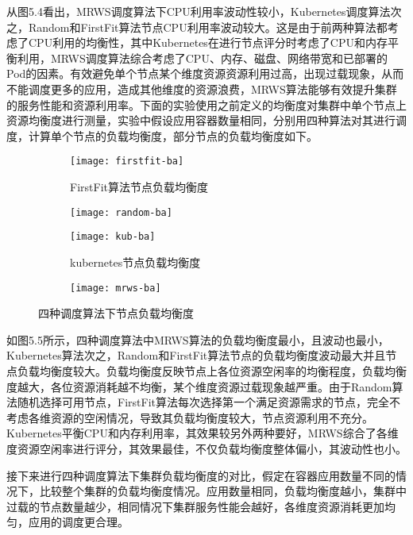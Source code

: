 从图5.4看出，MRWS调度算法下CPU利用率波动性较小，Kubernetes调度算法次之，Random和FirstFit算法节点CPU利用率波动较大。这是由于前两种算法都考虑了CPU利用的均衡性，其中Kubernetes在进行节点评分时考虑了CPU和内存平衡利用，MRWS调度算法综合考虑了CPU、内存、磁盘、网络带宽和已部署的Pod的因素。有效避免单个节点某个维度资源资源利用过高，出现过载现象，从而不能调度更多的应用，造成其他维度的资源浪费，MRWS算法能够有效提升集群的服务性能和资源利用率。下面的实验使用之前定义的均衡度对集群中单个节点上资源均衡度进行测量，实验中假设应用容器数量相同，分别用四种算法对其进行调度，计算单个节点的负载均衡度，部分节点的负载均衡度如下。

\begin{figure}[H]
	\centering%
	\begin{subfigure}{7cm}
		\texttt{[image: firstfit-ba]}
		\caption{FirstFit算法节点负载均衡度}
	\end{subfigure}%
	\hspace{0.5cm}%
	\begin{subfigure}{7cm}
		\texttt{[image: random-ba]}
	\end{subfigure}
	\begin{subfigure}{7cm}
		\texttt{[image: kub-ba]}
		\caption{kubernetes节点负载均衡度}
	\end{subfigure}%
	\hspace{0.5cm}%
	\begin{subfigure}{7cm}
		\texttt{[image: mrws-ba]}
	\end{subfigure}
	\caption{四种调度算法下节点负载均衡度}
	
\end{figure}

如图5.5所示，四种调度算法中MRWS算法的负载均衡度最小，且波动也最小，Kubernetes算法次之，Random和FirstFit算法节点的负载均衡度波动最大并且节点负载均衡度较大。负载均衡度反映节点上各位资源空闲率的均衡程度，负载均衡度越大，各位资源消耗越不均衡，某个维度资源过载现象越严重。由于Random算法随机选择可用节点，FirstFit算法每次选择第一个满足资源需求的节点，完全不考虑各维资源的空闲情况，导致其负载均衡度较大，节点资源利用不充分。Kubernetes平衡CPU和内存利用率，其效果较另外两种要好，MRWS综合了各维度资源空闲率进行评分，其效果最佳，不仅负载均衡度整体偏小，其波动性也小。

接下来进行四种调度算法下集群负载均衡度的对比，假定在容器应用数量不同的情况下，比较整个集群的负载均衡度情况。应用数量相同，负载均衡度越小，集群中过载的节点数量越少，相同情况下集群服务性能会越好，各维度资源消耗更加均匀，应用的调度更合理。

